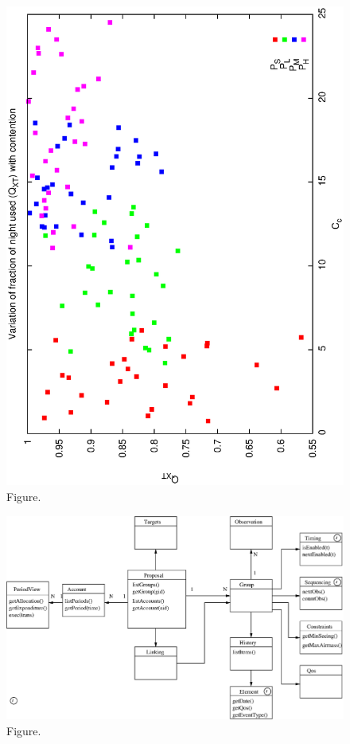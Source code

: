 \documentclass[12pt,a4paper]{article}
\begin{document}
\clearpage
\begin{figure}[htbp]
 \begin{center}
  \includegraphics[scale=1.0, angle=0]{figures/p2_gen_qxt.eps}
 \end{center}
  \caption[Figure.]
{Figure.}
\end{figure}
\clearpage
\begin{figure}[htbp]
 \begin{center}
  \includegraphics[scale=1.0, angle=0]{figures/phase2_architecture.eps}
 \end{center}
  \caption[Figure.]
{Figure.}
\end{figure}
\end{document}
